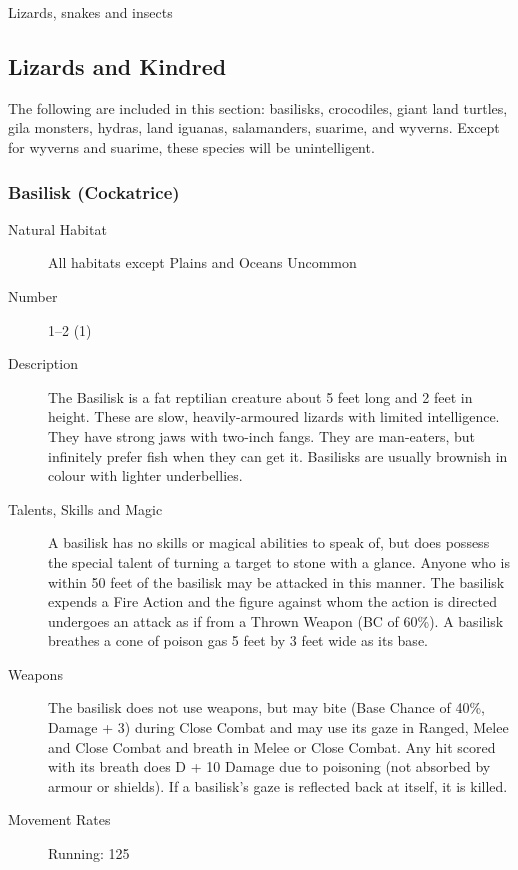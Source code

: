 \begin{mmgroup}{Lizards, snakes and insects}


\subsection{Lizards and Kindred}
The following are included in this section: basilisks, crocodiles,
giant land turtles, gila monsters, hydras, land iguanas, salamanders,
suarime, and wyverns.  Except for wyverns and suarime, these species
will be unintelligent.

\subsubsection{Basilisk (Cockatrice)}

\begin{description}
\item[Natural Habitat] All habitats except Plains and Oceans Uncommon

\item[Number] 1–2 (1)

\item[Description] The Basilisk is a fat reptilian creature about 5 feet
long and 2 feet in height. These are slow, heavily-armoured lizards
with limited intelligence.  They have strong jaws with two-inch
fangs.  They are man-eaters, but infinitely prefer fish when they can
get it.  Basilisks are usually brownish in colour with lighter
underbellies.

\item[Talents, Skills and Magic] A basilisk has no skills or magical abilities to speak of,
but does possess the special talent of turning a target to stone with
a glance.  Anyone who is within 50 feet of the basilisk may be
attacked in this manner.  The basilisk expends a Fire Action and the
figure against whom the action is directed undergoes an attack as if
from a Thrown Weapon (BC of 60\%). A basilisk breathes a cone of
poison gas 5 feet by 3 feet wide as its base.

\item[Weapons] The basilisk does not use weapons, but may bite (Base Chance
of 40\%, Damage + 3) during Close Combat and may use its gaze in
Ranged, Melee and Close Combat and breath in Melee or Close Combat.
Any hit scored with its breath does D + 10 Damage due to poisoning
(not absorbed by armour or shields). If a basilisk's gaze is reflected
back at itself, it is killed.

\item[Movement Rates] Running: 125


\end{description}
\end{mmgroup}
